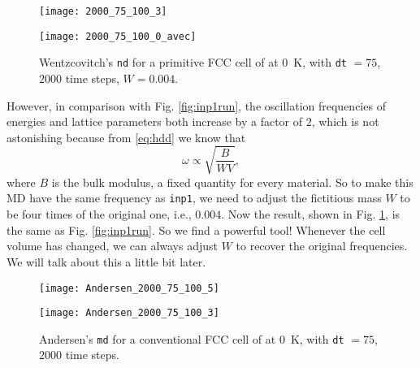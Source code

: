 \begin{figure}[h]
	\centering
	\begin{minipage}[t]{.48\linewidth}
		\centering
		\texttt{[image: 2000\_75\_100\_3]}
		\label{fig:inp4:a}
	\end{minipage}%
	\hfill
	\begin{minipage}[t]{.48\linewidth}
		\centering
		\texttt{[image: 2000\_75\_100\_0\_avec]}
		\label{fig:inp4:b}
	\end{minipage}
	\caption{
		Wentzcovitch's \texttt{nd} for a primitive FCC cell of  at \SI{0}{\kelvin}, with \texttt{dt} $=75$, $2000$ time steps, $W = 0.004$.}
	\label{fig:inp4}
\end{figure}

However, in comparison with Fig. \ref{fig:inp1run},
the oscillation frequencies of energies and lattice parameters
both increase by a factor of $2$, which is not astonishing because from
\eqref{eq:hdd} we know that
\begin{equation}
	\omega \propto \sqrt{
		\frac{ B }{ W V }
	},
\end{equation}
where $B$ is the bulk modulus, a fixed quantity for every material. So to make this MD
have the same frequency as \texttt{inp1}, we need to adjust the fictitious mass $W$ to be
four times of the original one, i.e., $0.004$.
Now the result, shown in Fig. \ref{fig:inp4}, is the same as Fig. \ref{fig:inp1run}. So we find a powerful tool! Whenever the cell volume has changed, we can always
adjust $W$ to recover the original frequencies. We will talk about this a little bit later.

\begin{figure}[h]
	\centering
	\begin{minipage}[t]{0.48\textwidth}
		\centering
		\texttt{[image: Andersen\_2000\_75\_100\_5]}
		\label{fig:andersen0:mini:subfig:a}   %
	\end{minipage}
	\hfill
	\begin{minipage}[t]{0.48\textwidth}
		\centering
		\texttt{[image: Andersen\_2000\_75\_100\_3]}
		\label{fig:andersen0:mini:subfig:b}   %
	\end{minipage}
	\caption{Andersen's \texttt{md} for a conventional FCC cell of  at \SI{0}{\kelvin}, with
		\texttt{dt} $=75$, $2000$ time steps.}
	\label{fig:andersen0}   %
\end{figure}

